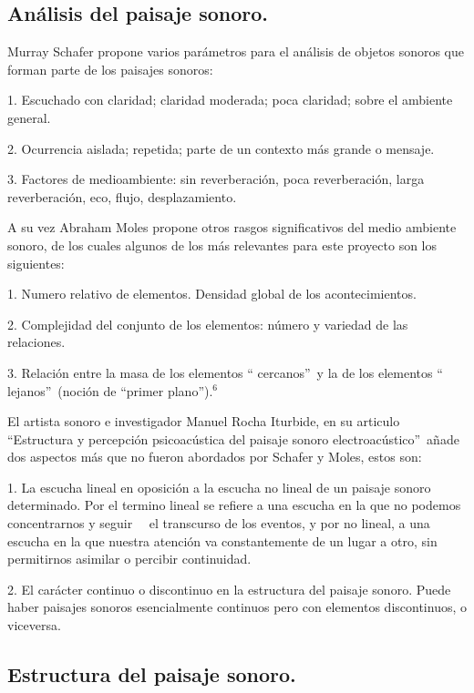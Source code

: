 \subsection{An\'{a}lisis del paisaje sonoro.}

Murray Schafer propone varios par\'{a}metros para el an\'{a}lisis de objetos
sonoros que forman parte de los paisajes sonoros:

1. Escuchado con claridad; claridad moderada; poca claridad; sobre el ambiente general.

2. Ocurrencia aislada; repetida; parte de un contexto m\'{a}s grande o mensaje.

3. Factores de medioambiente: sin reverberaci\'{o}n, poca reverberaci\'{o}n,
larga reverberaci\'{o}n, eco, flujo, desplazamiento.

A su vez Abraham Moles propone otros rasgos significativos del medio ambiente
sonoro, de los cuales algunos de los m\'{a}s relevantes para este proyecto son
los siguientes:

1. Numero relativo de elementos. Densidad global de los acontecimientos.

2. Complejidad del conjunto de los elementos: n\'{u}mero y variedad de las relaciones.

3. Relaci\'{o}n entre la masa de los elementos \textquotedblleft
cercanos\textquotedblright\ y la de los elementos \textquotedblleft
lejanos\textquotedblright\ (noci\'{o}n de \textquotedblleft primer
plano\textquotedblright).$^{6}$

El artista sonoro e investigador Manuel Rocha Iturbide, en su articulo
\textquotedblleft Estructura y percepci\'{o}n psicoac\'{u}stica del paisaje
sonoro electroac\'{u}stico\textquotedblright\ a\~{n}ade dos aspectos m\'{a}s
que no fueron abordados por Schafer y Moles, estos son:

1. La escucha lineal en oposici\'{o}n a la escucha no lineal de un paisaje
sonoro determinado. Por el termino lineal se refiere a una escucha en la que
no podemos concentrarnos y seguir \qquad\ \ el transcurso de los eventos, y
por no lineal, a una escucha en la que nuestra atenci\'{o}n va constantemente
de un lugar a otro, sin permitirnos asimilar o percibir continuidad.

2. El car\'{a}cter continuo o discontinuo en la estructura del paisaje sonoro.
Puede haber paisajes sonoros esencialmente continuos pero con elementos
discontinuos, o viceversa.

\subsection{Estructura del paisaje sonoro.}

